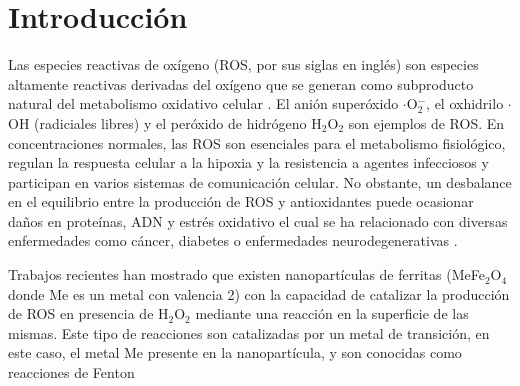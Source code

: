 \documentclass[aps,prl,reprint,superscriptaddress,showkeys]{revtex4-2}
\begin{document}

\maketitle

\section{Introducción}

Las especies reactivas de oxígeno (ROS, por sus siglas en inglés) son especies altamente reactivas derivadas del oxígeno que se generan como subproducto natural del metabolismo oxidativo celular \cite{liu_biomedical_2020}. El anión superóxido $\cdot$O$_2^-$, el oxhidrilo $\cdot$OH (radiciales libres) y el peróxido de hidrógeno H$_2$O$_2$ son ejemplos de ROS. En concentraciones normales, las ROS son esenciales para el metabolismo fisiológico, regulan la respuesta celular a la hipoxia y la resistencia a agentes infecciosos y participan en varios sistemas de comunicación celular. No obstante, un desbalance en el equilibrio entre la producción de ROS y antioxidantes puede ocasionar daños en proteínas, ADN y estrés oxidativo el cual se ha relacionado con diversas enfermedades como cáncer, diabetes o enfermedades neurodegenerativas \cite{liu_biomedical_2020}. 

Trabajos recientes \cite{maldonado_actividad_nodate,gao_intrinsic_2007} han mostrado que existen nanopartículas de ferritas (MeFe$_2$O$_4$ donde Me es un metal con valencia 2) con la capacidad de catalizar la producción de ROS en presencia de H$_2$O$_2$ mediante una reacción en la superficie de las mismas. Este tipo de reacciones son catalizadas por un metal de transición, en este caso, el metal Me presente en la nanopartícula, y son conocidas como reacciones de Fenton \cite{FentonLXXIIIOxidationOT}
\end{document}
